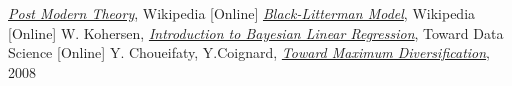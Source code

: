 \begin{thebibliography}{9}
\href{https://en.wikipedia.org/wiki/Post-modern_portfolio_theory}{\emph{Post Modern Theory}}, Wikipedia [Online]
\href{https://en.wikipedia.org/wiki/Black\%E2\%80\%93Litterman_model}{\emph{Black-Litterman Model}}, Wikipedia [Online]
W. Kohersen, \href{https://towardsdatascience.com/introduction-to-bayesian-linear-regression-e66e60791ea7}{\emph{Introduction to Bayesian Linear Regression}}, Toward Data Science [Online]
 Y. Choueifaty, Y.Coignard, \href{ https://www.tobam.fr/wp-content/uploads/2014/12/TOBAM-JoPM-Maximum-Div-2008.pdf}{\emph{Toward Maximum Diversification}}, 2008
\end{thebibliography}